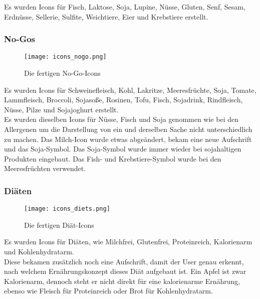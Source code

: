 Es wurden Icons für Fisch, Laktose, Soja, Lupine, Nüsse, Gluten, Senf, Sesam, Erdnüsse, Sellerie, Sulfite, Weichtiere, Eier und Krebstiere erstellt. 

\subsubsection{No-Gos}

\begin{figure}[H] \centering \texttt{[image: icons\_nogo.png]} \caption{Die fertigen No-Go-Icons} \end{figure}

Es wurden Icons für Schweinefleisch, Kohl, Lakritze, Meeresfrüchte, Soja, Tomate, Lammfleisch, Broccoli, Sojasoße, Rosinen, Tofu, Fisch, Sojadrink, Rindfleisch, Nüsse, Pilze und Sojajoghurt erstellt.\\
Es wurden dieselben Icons für Nüsse, Fisch und Soja genommen wie bei den Allergenen um die Darstellung von ein und derselben Sache nicht unterschiedlich zu machen. Das Milch-Icon wurde etwas abgeändert, bekam eine neue Aufschrift und das Soja-Symbol. Das Soja-Symbol wurde immer wieder bei sojahaltigen Produkten eingebaut. Das Fish- und Krebstiere-Symbol wurde bei den Meeresfrüchten verwendet.

\subsubsection{Diäten}

\begin{figure}[H] \centering \texttt{[image: icons\_diets.png]} \caption{Die fertigen Diät-Icons} \end{figure}

Es wurden Icons für Diäten, wie Milchfrei, Glutenfrei, Proteinreich, Kalorienarm und Kohlenhydratarm.\\
Diese bekamen zusätzlich noch eine Aufschrift, damit der User genau erkennt, nach welchem Ernährungskonzept dieses Diät aufgebaut ist. Ein Apfel ist zwar Kalorienarm, dennoch steht er nicht direkt für eine kalorienarme Ernährung, ebenso wie Fleisch für Proteinreich oder Brot für Kohlenhydratarm. 



